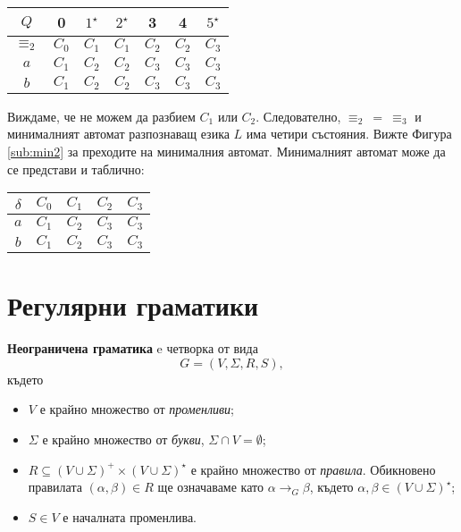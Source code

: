 \begin{example}
\begin{itemize}
      \begin{tabular}{|c|c|c|c|c|c|c|}
        \hline
        $Q$ & 0 & $1^\star$ & $2^\star$ & 3 & 4 & $5^\star$ \\
        \hline
        \hline
        $\equiv_2$ & $C_0$ & $C_1$ & $C_1$ & $C_2$ & $C_2$ & $C_3$\\
        \hline
        $a$ & $C_1$ & $C_2$ & $C_2$ & $C_3$ & $C_3$ & $C_3$\\
        \hline
        $b$ & $C_1$ & $C_2$ & $C_2$ & $C_3$ & $C_3$ & $C_3$\\
        \hline
      \end{tabular}
      
      Виждаме, че не можем да разбием $C_1$ или $C_2$.
      Следователно, $\equiv_2\ =\ \equiv_3$ и минималният автомат разпознаващ езика $L$
      има четири състояния. Вижте Фигура \ref{sub:min2} за преходите на минималния автомат.
      Минималният автомат може да се представи и таблично:

      \begin{tabular}{|c|c|c|c|c|}
        \hline
        $\delta$ & $C_0$ & $C_1$ & $C_2$ & $C_3$ \\
        \hline
        $a$ & $C_1$ & $C_2$ & $C_3$ & $C_3$ \\
        \hline
        $b$ & $C_1$ & $C_2$ & $C_3$ & $C_3$ \\
        \hline
      \end{tabular}
      
  \end{itemize}
\end{example}

\section{Регулярни граматики}
\label{sect:regular-grammar}
{\bf Неограничена граматика} e четворка от вида
\[G = (V, \Sigma, R, S),\]
където
\begin{itemize}
\item
  $V$ е крайно множество от {\em променливи};
\item
  $\Sigma$ е крайно множество от {\em букви}, $\Sigma \cap V = \emptyset$;
\item
  $R \subseteq (V\cup\Sigma)^+ \times (V \cup \Sigma)^\star$ е крайно множество от {\em правила}.
  Обикновено правилата $(\alpha, \beta) \in R$ ще означаваме като 
  $\alpha \to_G \beta$, където $\alpha, \beta \in (V \cup \Sigma)^\star$;
\item
  $S \in V$ е началната променлива. 
\end{itemize}

